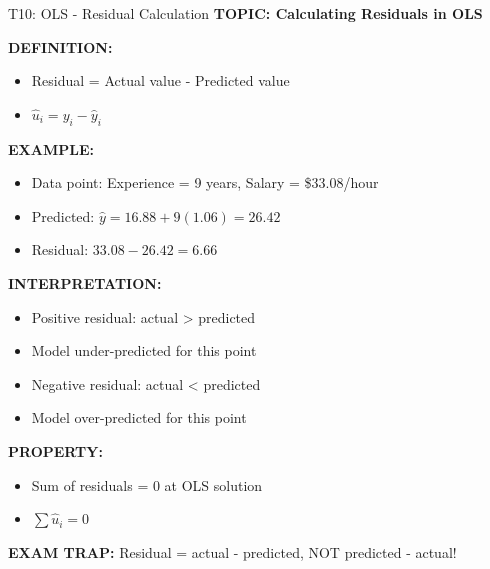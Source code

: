 \documentclass[8pt]{beamer}
\begin{document}
	\begin{frame}{T10: OLS - Residual Calculation}
		\fontsize{6.5}{7.5}\selectfont
		\textbf{TOPIC: Calculating Residuals in OLS}
		
		\vspace{0.1cm}
		\textbf{DEFINITION:}
		\begin{itemize}
			\item Residual = Actual value - Predicted value
			\item $\hat{u}_i = y_i - \hat{y}_i$
		\end{itemize}
		
		\vspace{0.1cm}
		\textbf{EXAMPLE:}
		\begin{itemize}
			\item Data point: Experience = 9 years, Salary = \$33.08/hour
			\item Predicted: $\hat{y} = 16.88 + 9(1.06) = 26.42$
			\item Residual: $33.08 - 26.42 = 6.66$
		\end{itemize}
		
		\vspace{0.1cm}
		\textbf{INTERPRETATION:}
		\begin{itemize}
			\item Positive residual: actual > predicted
			\item Model under-predicted for this point
			\item Negative residual: actual < predicted
			\item Model over-predicted for this point
		\end{itemize}
		
		\vspace{0.1cm}
		\textbf{PROPERTY:}
		\begin{itemize}
			\item Sum of residuals = 0 at OLS solution
			\item $\sum \hat{u}_i = 0$
		\end{itemize}
		
		\textcolor{myred}{\textbf{EXAM TRAP:}} Residual = \textcolor{myblue}{actual - predicted}, NOT predicted - actual!
	\end{frame}
	
\end{document}
